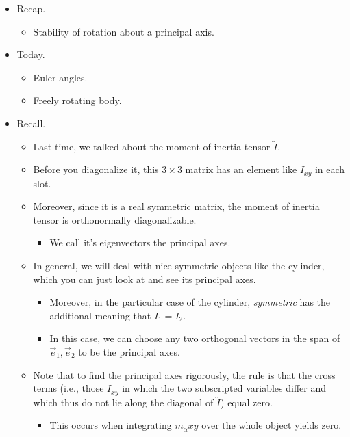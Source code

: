 \documentclass[../notes.tex]{subfiles}
\begin{document}
\begin{itemize}
    \item {}Recap.
    \begin{itemize}
        \item Stability of rotation about a principal axis.
    \end{itemize}
    \item Today.
    \begin{itemize}
        \item Euler angles.
        \item Freely rotating body.
    \end{itemize}
    \item Recall.
    \begin{itemize}
        \item Last time, we talked about the moment of inertia tensor $\overleftrightarrow{I}$.
        \item Before you diagonalize it, this $3\times 3$ matrix has an element like $I_{xy}$ in each slot.
        \item Moreover, since it is a real symmetric matrix, the moment of inertia tensor is orthonormally diagonalizable.
        \begin{itemize}
            \item We call it's eigenvectors the principal axes.
        \end{itemize}
        \item In general, we will deal with nice symmetric objects like the cylinder, which you can just look at and see its principal axes.
        \begin{itemize}
            \item Moreover, in the particular case of the cylinder, \emph{symmetric} has the additional meaning that $I_1=I_2$.
            \item In this case, we can choose any two orthogonal vectors in the span of $\vec{e}_1,\vec{e}_2$ to be the principal axes.
        \end{itemize}
        \item Note that to find the principal axes rigorously, the rule is that the cross terms (i.e., those $I_{xy}$ in which the two subscripted variables differ and which thus do not lie along the diagonal of $\overleftrightarrow{I}$) equal zero.
        \begin{itemize}
            \item This occurs when integrating $m_\alpha xy$ over the whole object yields zero.

\end{itemize}
\end{itemize}
\end{itemize}
\end{document}
